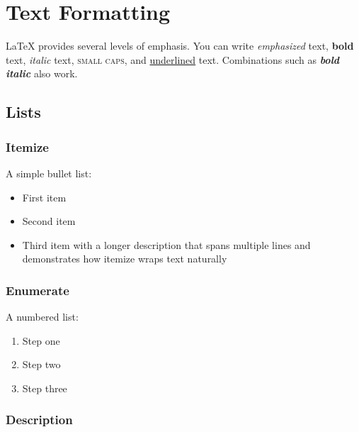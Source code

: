 \documentclass[11pt]{article}
\theoremstyle{definition}
\theoremstyle{plain}
\begin{document}





\section{Text Formatting}
\label{sec:text}

\LaTeX{} provides several levels of emphasis.
You can write \emph{emphasized} text, \textbf{bold} text,
\textit{italic} text, \textsc{small caps}, and \underline{underlined}
text.
Combinations such as \textbf{\emph{bold italic}} also work.

\subsection{Lists}

\subsubsection{Itemize}
\label{sec:text:lists:itemize}

A simple bullet list:

\begin{itemize}[noitemsep]
    \item First item
    \item Second item
    \item Third item with a longer description that spans multiple lines
          and demonstrates how itemize wraps text naturally
\end{itemize}

\subsubsection{Enumerate}
\label{sec:text:lists:enumerate}

A numbered list:

\begin{enumerate}[noitemsep]
    \item Step one
    \item Step two
    \item Step three
\end{enumerate}

\subsubsection{Description}
\label{sec:text:lists:description}
\end{document}
